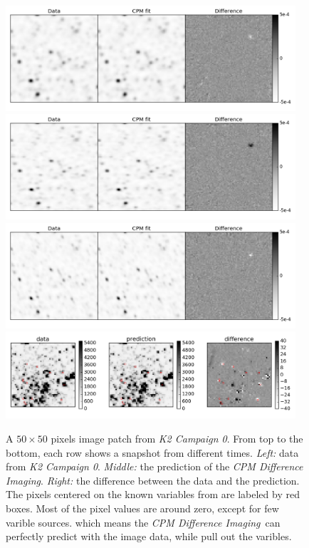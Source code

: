 \documentclass[12pt, preprint]{aastex}
\newcommand{\project}[1]{\textsl{#1}}
\newcommand{\cpmdiff}{\project{CPM Difference Imaging}}
\newcommand{\KTCZ}{\project{K2 Campaign 0}}
\begin{document}
\begin{figure}[p]
\begin{center}
\includegraphics[width=0.96\textwidth]{f2a}
\includegraphics[width=0.96\textwidth]{f2b}
\includegraphics[width=0.96\textwidth]{f2c}
\includegraphics[width=0.96\textwidth]{f2d}

\end{center}
\caption{
  \label{images} 
  A $50\times50$ pixels image patch from \KTCZ. From top to the bottom,  each row shows a snapshot from different times.
  \emph{Left:} data from \KTCZ.
  \emph{Middle:} the prediction of the \cpmdiff.
  \emph{Right:} the difference between the data and the prediction.
  The pixels centered on the known variables from \cite{variables} are labeled by red boxes. 
  Most of the pixel values are around zero, except for few varible sources. which means the \cpmdiff\ can perfectly predict with the image data, while pull out the varibles.
}
\end{figure}
\end{document}
